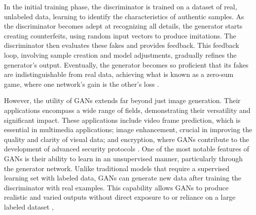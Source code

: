 In the initial training phase, the discriminator is trained on a dataset of real, unlabeled data, learning to identify the characteristics of authentic samples. As the discriminator becomes adept at recognizing all details, the generator starts creating counterfeits, using random input vectors to produce imitations. The discriminator then evaluates these fakes and provides feedback. This feedback loop, involving sample creation and model adjustments, gradually refines the generator's output. Eventually, the generator becomes so proficient that its fakes are indistinguishable from real data, achieving what is known as a zero-sum game, where one network's gain is the other's loss \citep{goodfellowGAN}.

However, the utility of GANs extends far beyond just image generation. Their applications encompass a wide range of fields, demonstrating their versatility and significant impact. These applications include video frame prediction, which is essential in multimedia applications; image enhancement, crucial in improving the quality and clarity of visual data; and encryption, where GANs contribute to the development of advanced security protocols \citep{goodfellowGAN}. One of the most notable features of GANs is their ability to learn in an unsupervised manner, particularly through the generator network. Unlike traditional models that require a supervised learning set with labeled data, GANs can generate new data after training the discriminator with real examples. This capability allows GANs to produce realistic and varied outputs without direct exposure to or reliance on a large labeled dataset \citep{GoodfellowDeepLearning},


